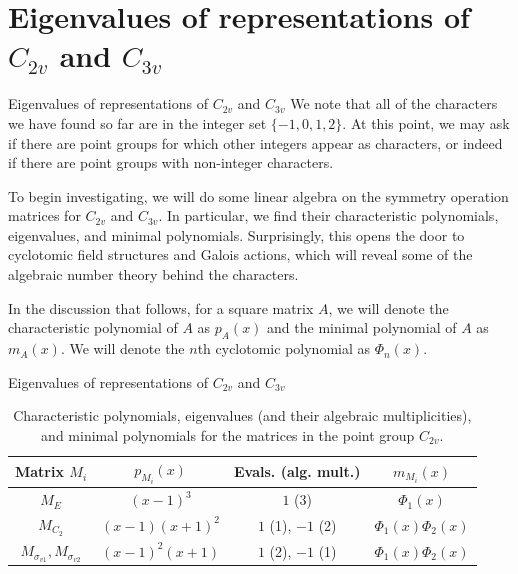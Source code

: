 \documentclass{beamer}
\newcommand{\vs}{\vspace{5mm}}
\begin{document}
    \section{\texorpdfstring{Eigenvalues of representations of $C_{2v}$ and $C_{3v}$}{Eigenvalues of representations of C2v and C3v}}
    
    \begin{frame}{Eigenvalues of representations of $C_{2v}$ and $C_{3v}$}
        We note that all of the characters we have found so far are in the integer set $\{-1,0,1,2\}$. At this point, we may ask if there are point groups for which other integers appear as characters, or indeed if there are point groups with non-integer characters.
        \vs
        
        {
            To begin investigating, we will do some linear algebra on the symmetry operation matrices for $C_{2v}$ and $C_{3v}$. In particular, we find their characteristic polynomials, eigenvalues, and minimal polynomials. Surprisingly, this opens the door to cyclotomic field structures and Galois actions, which will reveal some of the algebraic number theory behind the characters.
        }
        \vs

        {
            In the discussion that follows, for a square matrix $A$, we will denote the characteristic polynomial of $A$ as $p_A(x)$ and the minimal polynomial of $A$ as $m_A(x)$. We will denote the $n$th cyclotomic polynomial as $\Phi_n(x)$.
        }
    \end{frame}
    
    \begin{frame}{Eigenvalues of representations of $C_{2v}$ and $C_{3v}$}
        \begin{table}[p]
            \centering
            \renewcommand{\arraystretch}{3}
            \begin{tabular}{cccc}
                Matrix $M_i$ & $p_{M_i}(x)$ & Evals. (alg. mult.) & $m_{M_i}(x)$\\
                \hline
                $M_E$ & $(x-1)^3$ & $1$ (3) & $\Phi_1(x)$\\[5mm]
                $M_{C_2}$ & $(x-1)(x+1)^2$ & $1$ (1), $-1$ (2) & $\Phi_1(x)\Phi_2(x)$\\[5mm]
                $M_{\sigma_{v1}}, M_{\sigma_{v2}}$ & $(x-1)^2(x+1)$ & $1$ (2), $-1$ (1) & $\Phi_1(x)\Phi_2(x)$
            \end{tabular}
            \caption{Characteristic polynomials, eigenvalues (and their algebraic multiplicities), and minimal polynomials for the matrices in the point group $C_{2v}$.}
        \end{table}
    \end{frame}
\end{document}
